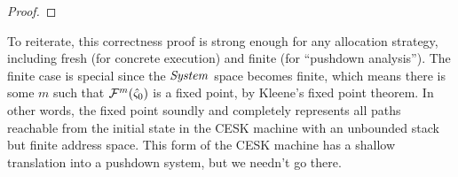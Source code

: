 \begin{proof}
\end{proof}

To reiterate, this correctness proof is strong enough for any allocation strategy, including fresh (for concrete execution) and finite (for ``pushdown analysis'').
%
The finite case is special since the $\mathit{System}$ space becomes finite, which means there is some $m$ such that ${\mathcal F}^m(\hat\varsigma_0)$ is a fixed point, by Kleene's fixed point theorem.
%
In other words, the fixed point soundly and completely represents all paths reachable from the initial state in the CESK machine with an unbounded stack but finite address space.
%
This form of the CESK machine has a shallow translation into a pushdown system, but we needn't go there.